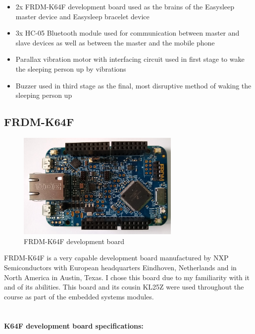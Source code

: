 \documentclass[12pt,a4paper]{article}
\begin{document}
	\begin{itemize}
	 \item 2x FRDM-K64F development board used as the brains of the Easysleep master device and Easysleep bracelet device
	 \item 3x HC-05 Bluetooth module used for communication between master and slave devices as well as between the master and the mobile phone
	 \item Parallax vibration motor with interfacing circuit used in first stage to wake the sleeping person up by vibrations
	 \item Buzzer used in third stage as the final, most disruptive method of waking the sleeping  person up
	\end{itemize}

		\subsection{FRDM-K64F}
		\begin{figure}[h]
			\centering
			\includegraphics[width=0.7\textwidth]{k64f1.jpg}\par\vspace{0cm}
			\caption{FRDM-K64F development board}
		\end{figure}
		FRDM-K64F is a very capable development board manufactured by NXP Semiconductors with
		European headquarters Eindhoven, Netherlands and in North America in Austin, Texas. I chose this board due to my familiarity with it and of its abilities. This board and its cousin KL25Z were used throughout the course as part of the embedded systems modules.\\\\\\
		{\bfseries K64F development board specifications:}  	
\end{document}
